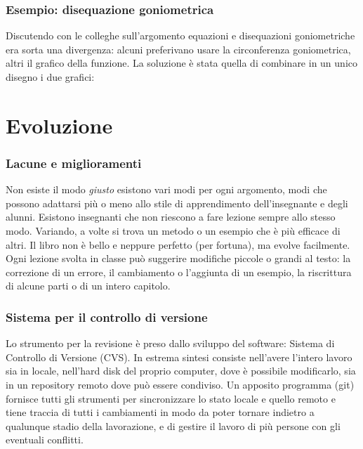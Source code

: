 \documentclass{beamer} %
\begin{document}
\begin{frame}\frametitle{Esempio: disequazione goniometrica}

Discutendo con le 
colleghe sull'argomento equazioni e 
disequazioni goniometriche era sorta una divergenza: alcuni preferivano 
usare la circonferenza goniometrica, altri il grafico della funzione.
\spause
La soluzione è stata quella di combinare in un unico disegno i due grafici: 

\begin{center}
\disequazionegon
\end{center}

\end{frame}


\section{Evoluzione}

\begin{frame}\frametitle{Lacune e miglioramenti}

Non esiste il modo \emph{giusto} esistono vari modi per ogni argomento, 
modi che possono adattarsi più o meno allo stile di apprendimento 
dell'insegnante e degli alunni. 
\spause
Esistono insegnanti che non riescono a fare lezione sempre allo stesso 
modo.
Variando, a volte si trova un metodo o un esempio che è più efficace di altri.
\spause
Il libro non è bello e neppure perfetto (per fortuna), ma evolve facilmente.
Ogni lezione svolta in classe può suggerire modifiche piccole o grandi al 
testo: la correzione di un errore, il cambiamento o l'aggiunta di un esempio, 
la riscrittura di alcune parti o di un intero capitolo.

\end{frame}


\begin{frame}\frametitle{Sistema per il controllo di versione}

Lo strumento per la revisione è preso dallo sviluppo del software: 
Sistema di Controllo di Versione (CVS).
\spause
In estrema sintesi consiste nell'avere l'intero lavoro sia in locale, 
nell'hard disk del proprio computer, dove è possibile modificarlo, sia 
in un repository remoto dove può essere condiviso. 
\spause
Un apposito programma (git) fornisce tutti gli strumenti per 
sincronizzare lo stato locale e quello remoto e tiene traccia di tutti 
i cambiamenti in modo da poter tornare indietro a qualunque stadio della 
lavorazione, e di gestire il lavoro di più persone con gli eventuali 
conflitti.

\end{frame}
\end{document}
